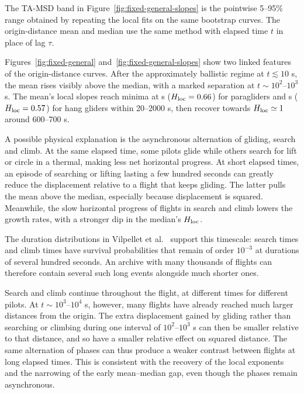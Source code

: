 The TA-MSD band in Figure~\ref{fig:fixed-general-slopes} is the pointwise 5--95\%
range obtained by repeating the local fits on the same bootstrap curves.
The origin-distance mean and median use the same method with elapsed time $t$
in place of lag $\tau$.

Figures~\ref{fig:fixed-general} and~\ref{fig:fixed-general-slopes} show two linked
features of the origin-distance curves. After the approximately ballistic regime
at $t\lesssim10$ s, the mean rises visibly above the median, with a marked
separation at $t\sim10^2$--$10^3$ s. The mean's local slopes reach minima at \ChThreeParaLocalMinLag{} s
($H_{\rm loc}=0.66$) for paragliders and \ChThreeHangLocalMinLag{} s
($H_{\rm loc}=0.57$) for hang gliders within 20--2000 s, then recover
towards $H_{\rm loc}\simeq1$ around 600--700 s.


A possible physical explanation is the asynchronous alternation of gliding,
search and climb. At the same elapsed time, some pilots glide while others search
for lift or circle in a thermal, making less net horizontal progress. At short
elapsed times, an episode of searching or lifting lasting a few hundred seconds can greatly reduce the
displacement relative to a flight that keeps gliding. The latter pulls the mean
above the median, especially because displacement is squared. Meanwhile, the
slow horizontal progress of flights in search and climb lowers the growth rates,
with a stronger dip in the median's $H_{\rm loc}$.

The duration distributions in Vilpellet et al.~\cite[Fig.~4f,i]{vilpellet2026}
support this timescale: search times and climb times have survival probabilities that remain of order $10^{-3}$ at
durations of several hundred seconds. An archive with many thousands of flights
can therefore contain several such long events alongside much shorter ones.

Search and climb continue throughout the flight, at different times for different
pilots. At $t\sim10^3$--$10^4$ s, however, many flights have already reached much
larger distances from the origin. The extra displacement gained by gliding rather
than searching or climbing during one interval of $10^2$--$10^3$ s can then be
smaller relative to that distance, and so have a smaller relative effect on
squared distance. The same alternation of phases can thus produce a weaker contrast between
flights at long elapsed times. This is consistent with the recovery of the local
exponents and the narrowing of the early mean--median gap, even though the phases
remain asynchronous.

